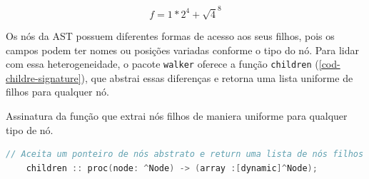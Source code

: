 \begin{equation} \label{eq-svg}
   f =  1*2 ^ 4 + \sqrt 4^8
\end{equation}

Os nós da AST possuem diferentes formas de acesso aos seus filhos, pois os campos podem ter nomes ou posições variadas conforme o tipo do nó. Para lidar com essa heterogeneidade, o pacote \texttt{walker} oferece a função \texttt{children} (\autoref{cod-childre-signature}), que abstrai essas diferenças e retorna uma lista uniforme de filhos para qualquer nó.

\begin{codigo}[H]
        \caption{\small Assinatura da função que extrai nós filhos de maniera uniforme para qualquer tipo de nó. }
        \label{cod-childre-signature}
  \begin{lstlisting}[language = C]
    // Aceita um ponteiro de nós abstrato e return uma lista de nós filhos
    children :: proc(node: ^Node) -> (array :[dynamic]^Node);
  \end{lstlisting}
\end{codigo}

